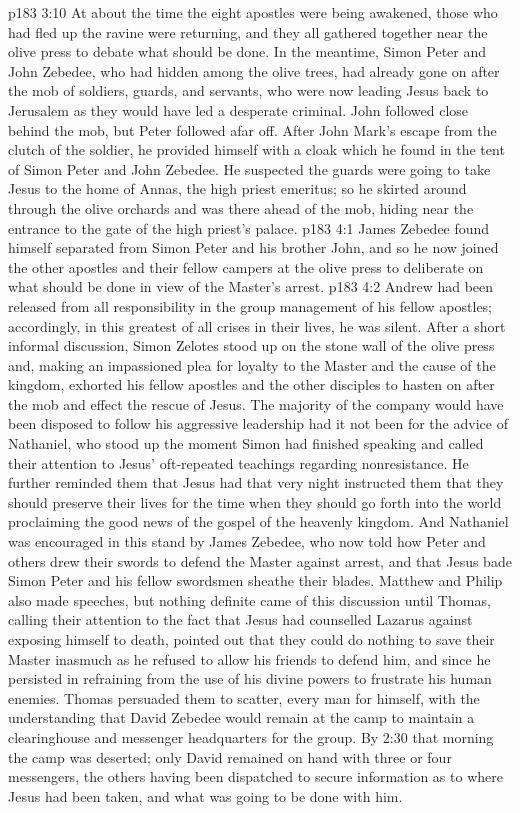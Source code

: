 \vs p183 3:10 At about the time the eight apostles were being awakened, those who had fled up the ravine were returning, and they all gathered together near the olive press to debate what should be done. In the meantime, Simon Peter and John Zebedee, who had hidden among the olive trees, had already gone on after the mob of soldiers, guards, and servants, who were now leading Jesus back to Jerusalem as they would have led a desperate criminal. John followed close behind the mob, but Peter followed afar off. After John Mark’s escape from the clutch of the soldier, he provided himself with a cloak which he found in the tent of Simon Peter and John Zebedee. He suspected the guards were going to take Jesus to the home of Annas, the high priest emeritus; so he skirted around through the olive orchards and was there ahead of the mob, hiding near the entrance to the gate of the high priest’s palace.
\vs p183 4:1 James Zebedee found himself separated from Simon Peter and his brother John, and so he now joined the other apostles and their fellow campers at the olive press to deliberate on what should be done in view of the Master’s arrest.
\vs p183 4:2 Andrew had been released from all responsibility in the group management of his fellow apostles; accordingly, in this greatest of all crises in their lives, he was silent. After a short informal discussion, Simon Zelotes stood up on the stone wall of the olive press and, making an impassioned plea for loyalty to the Master and the cause of the kingdom, exhorted his fellow apostles and the other disciples to hasten on after the mob and effect the rescue of Jesus. The majority of the company would have been disposed to follow his aggressive leadership had it not been for the advice of Nathaniel, who stood up the moment Simon had finished speaking and called their attention to Jesus’ oft\hyp{}repeated teachings regarding nonresistance. He further reminded them that Jesus had that very night instructed them that they should preserve their lives for the time when they should go forth into the world proclaiming the good news of the gospel of the heavenly kingdom. And Nathaniel was encouraged in this stand by James Zebedee, who now told how Peter and others drew their swords to defend the Master against arrest, and that Jesus bade Simon Peter and his fellow swordsmen sheathe their blades. Matthew and Philip also made speeches, but nothing definite came of this discussion until Thomas, calling their attention to the fact that Jesus had counselled Lazarus against exposing himself to death, pointed out that they could do nothing to save their Master inasmuch as he refused to allow his friends to defend him, and since he persisted in refraining from the use of his divine powers to frustrate his human enemies. Thomas persuaded them to scatter, every man for himself, with the understanding that David Zebedee would remain at the camp to maintain a clearinghouse and messenger headquarters for the group. By 2:30 that morning the camp was deserted; only David remained on hand with three or four messengers, the others having been dispatched to secure information as to where Jesus had been taken, and what was going to be done with him.
